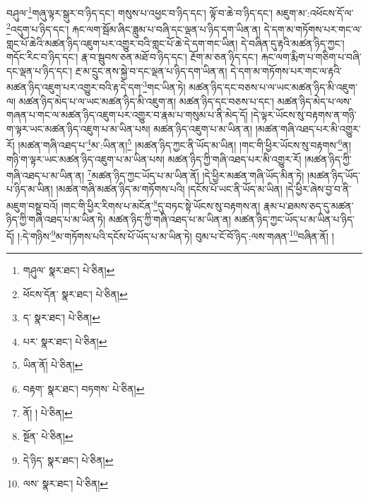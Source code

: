 བཤུལ་\footnote{གཤུལ་  སྣར་ཐང་།  པེ་ཅིན། }གཞུ་ལྟར་སྒུར་བ་ཉིད་དང་། གསུས་པ་འཕྱང་བ་ཉིད་དང་། ལྟོ་བ་ཆེ་བ་ཉིད་དང་། མཇུག་མ་:འཕོངས་དོ་ལ་\footnote{ཕོངས་དོན་  སྣར་ཐང་།  པེ་ཅིན། }འདུག་པ་ཉིད་དང་། རྐང་ལག་སྦོམ་ཞིང་ཟླུམ་པ་བཞི་དང་ལྡན་པ་ཉིད་དག་ཡིན་ན། དེ་དག་མ་གཏོགས་པར་གང་ལ་གླང་པོ་ཆེའི་མཚན་ཉིད་འཇུག་པར་འགྱུར་བའི་གླང་པོ་ཆེ་དེ་དག་གང་ཡིན། དེ་བཞིན་དུ་རྟའི་མཚན་ཉིད་ཀྱང་། གདོང་རིང་བ་ཉིད་དང་། རྣ་བ་སྦུབས་ཅན་མཐོ་བ་ཉིད་དང་། རྔོག་མ་ཅན་ཉིད་དང་། རྐང་ལག་རྨིག་པ་གཅིག་པ་བཞི་དང་ལྡན་པ་ཉིད་དང་། རྔ་མ་དྲུང་ནས་སྐྱེ་བ་དང་ལྡན་པ་ཉིད་དག་ཡིན་ན། དེ་དག་མ་གཏོགས་པར་གང་ལ་རྟའི་མཚན་ཉིད་འཇུག་པར་འགྱུར་བའི་རྟ་དེ་དག་\footnote{ད་  སྣར་ཐང་།  པེ་ཅིན། }གང་ཡིན་ཏེ། མཚན་ཉིད་དང་བཅས་པ་ལ་ཡང་མཚན་ཉིད་མི་འཇུག་ལ། མཚན་ཉིད་མེད་པ་ལ་ཡང་མཚན་ཉིད་མི་འཇུག་ན། མཚན་ཉིད་དང་བཅས་པ་དང་། མཚན་ཉིད་མེད་པ་ལས་གཞན་པ་གང་ལ་མཚན་ཉིད་འཇུག་པར་འགྱུར་བ་རྣམ་པ་གསུམ་པ་ནི་མེད་དོ། །དེ་ལྟར་ཡོངས་སུ་བརྟགས་ན་གཉི་ག་ལྟར་ཡང་མཚན་ཉིད་འཇུག་པ་མ་ཡིན་པས། མཚན་ཉིད་འཇུག་པ་མ་ཡིན་ན། །མཚན་གཞི་འཐད་པར་མི་འགྱུར་རོ། །མཚན་གཞི་འཐད་པ་\footnote{པར་  སྣར་ཐང་།  པེ་ཅིན། }མ་:ཡིན་ན།\footnote{ཡིན་ནོ།  པེ་ཅིན། } །མཚན་ཉིད་ཀྱང་ནི་ཡོད་མ་ཡིན། །གང་གི་ཕྱིར་ཡོངས་སུ་བརྟགས་\footnote{བརྟག་  སྣར་ཐང་། བཏགས་  པེ་ཅིན། }ན། གཉི་ག་ལྟར་ཡང་མཚན་ཉིད་འཇུག་པ་མ་ཡིན་པས། མཚན་ཉིད་ཀྱི་གཞི་འཐད་པར་མི་འགྱུར་རོ། །མཚན་ཉིད་ཀྱི་གཞི་འཐད་པ་མ་ཡིན་ན། \footnote{ནོ། །   པེ་ཅིན། }མཚན་ཉིད་ཀྱང་ཡོད་པ་མ་ཡིན་ནོ། །དེ་ཕྱིར་མཚན་གཞི་ཡོད་མིན་ཏེ། །མཚན་ཉིད་ཡོད་པ་ཉིད་མ་ཡིན། །མཚན་གཞི་མཚན་ཉིད་མ་གཏོགས་པའི། །དངོས་པོ་ཡང་ནི་ཡོད་མ་ཡིན། །དེ་ཕྱིར་ཞེས་བྱ་བ་ནི་མཇུག་བསྡུ་བའོ། །གང་གི་ཕྱིར་རིགས་པ་མངོན་\footnote{སྔོན་  པེ་ཅིན། }དུ་བཏང་སྟེ་ཡོངས་སུ་བརྟགས་ན། རྣམ་པ་ཐམས་ཅད་དུ་མཚན་ཉིད་ཀྱི་གཞི་འཐད་པ་མ་ཡིན་ཏེ། མཚན་ཉིད་ཀྱི་གཞི་འཐད་པ་མ་ཡིན་ན། མཚན་ཉིད་ཀྱང་ཡོད་པ་མ་ཡིན་པ་ཉིད་དོ། །:དེ་གཉིས་\footnote{དེ་ཉིད་  སྣར་ཐང་།  པེ་ཅིན། }མ་གཏོགས་པའི་དངོས་པོ་ཡོད་པ་མ་ཡིན་ཏེ། བུམ་པ་ངོ་བོ་ཉིད་:ལས་གཞན་\footnote{ལས་  སྣར་ཐང་།  པེ་ཅིན། }བཞིན་ནོ། །
